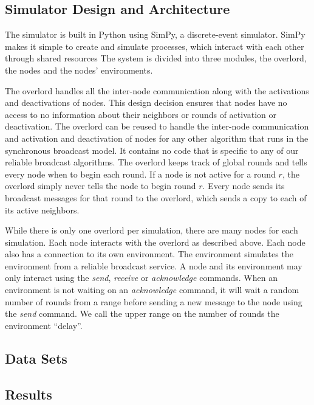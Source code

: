 \documentclass[english]{article}
\begin{document}
\subsection{Simulator Design and Architecture}

The simulator is built in Python using SimPy, a discrete-event simulator. SimPy makes it simple to create and simulate processes, which interact with each other through shared resources The system is divided into three modules, the overlord, the nodes and the nodes' environments. 

The overlord handles all the inter-node communication along with the activations and deactivations of nodes. This design decision ensures that nodes have no access to no information about their neighbors or rounds of activation or deactivation. The overlord can be reused to handle the inter-node communication and activation and deactivation of nodes for any other algorithm that runs in the synchronous broadcast model. It contains no code that is specific to any of our reliable broadcast algorithms. The overlord keeps track of global rounds and tells every node when to begin each round. If a node is not active for a round $r$, the overlord simply never tells the node to begin round $r$. Every node sends its broadcast messages for that round to the overlord, which sends a copy to each of its active neighbors. 

While there is only one overlord per simulation, there are many nodes for each simulation. Each node interacts with the overlord as described above. Each node also has a connection to its own environment. The environment simulates the environment from a reliable broadcast service. A node and its environment may only interact using the \textit{send}, \textit{receive} or \textit{acknowledge} commands. When an environment is not waiting on an \textit{acknowledge} command, it will wait a random number of rounds from a range before sending a new message to the node using the \textit{send} command. We call the upper range on the number of rounds the environment ``delay''.


\subsection{Data Sets}



\subsection{Results}
\end{document}
